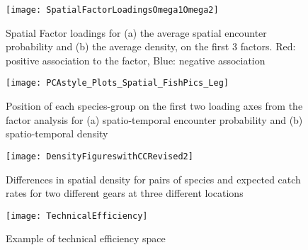 \documentclass{nature}
\begin{document}
\begin{figure}
\begin{center}
	\texttt{[image: SpatialFactorLoadingsOmega1Omega2]}
	\label{fig:2}
	\caption{Spatial Factor loadings for (a) the average spatial encounter
		probability and (b) the average density,  on the first 3
		factors. Red: positive association to the factor, Blue:
		negative association}
\end{center}
\end{figure}

\begin{figure}
\begin{center}
	\texttt{[image: PCAstyle\_Plots\_Spatial\_FishPics\_Leg]}
	\label{fig:3}
	\caption{Position of each species-group on the first two loading axes from the
	factor analysis for (a) spatio-temporal encounter probability and (b)
	spatio-temporal density}
\end{center}
\end{figure}

\begin{figure}
\begin{center}
	\texttt{[image: DensityFigureswithCCRevised2]}
	\label{fig:4}
	\caption{Differences in spatial density for pairs of species and
		expected catch rates for two different gears at three different
	locations}
\end{center}
\end{figure}

\begin{figure}
\begin{center}
	\texttt{[image: TechnicalEfficiency]}
	\label{fig:5}
	\caption{Example of technical efficiency space}
\end{center}
\end{figure}
\end{document}
